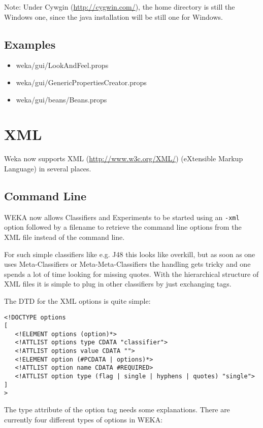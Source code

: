 \noindent Note: Under Cywgin (\url{http://cygwin.com/}{}), the home directory
is still the Windows one, since the java installation will be still
one for Windows.

\subsection{Examples}

\begin{itemize}
\item weka/gui/LookAndFeel.props
\item weka/gui/GenericPropertiesCreator.props
\item weka/gui/beans/Beans.props
\end{itemize}

\newpage
\section{XML}
Weka now supports XML (\url{http://www.w3c.org/XML/}{}) (eXtensible
Markup Language) in several places.

\subsection{Command Line}
\label{xml_command_line}
WEKA now allows Classifiers and Experiments to be started using an
\verb=-xml= option followed by a filename to retrieve the command line
options from the XML file instead of the command line.

For such simple classifiers like e.g. J48 this looks like overkill,
but as soon as one uses Meta-Classifiers or Meta-Meta-Classifiers the
handling gets tricky and one spends a lot of time looking for missing
quotes. With the hierarchical structure of XML files it is simple to
plug in other classifiers by just exchanging tags.

The DTD for the XML options is quite simple:

\begin{verbatim}
<!DOCTYPE options
[
   <!ELEMENT options (option)*>
   <!ATTLIST options type CDATA "classifier">
   <!ATTLIST options value CDATA "">
   <!ELEMENT option (#PCDATA | options)*>
   <!ATTLIST option name CDATA #REQUIRED>
   <!ATTLIST option type (flag | single | hyphens | quotes) "single">
]
>
\end{verbatim}

\noindent The type attribute of the option tag needs some
explanations. There are currently four different types of options in
WEKA:


